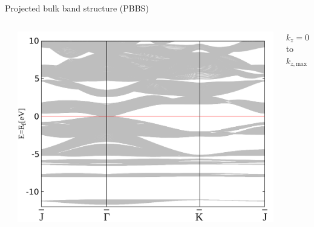 \begin{frame}[fragile]{Projected bulk band structure (PBBS)}
\begin{columns}
\begin{column}{.33\linewidth}
		\end{column}
		\begin{column}{.33\linewidth}
			\centering 
			\includegraphics[width=\linewidth]{andere_bilder/bulk_-12_10.pdf}
		\end{column}
		\begin{column}{.165\linewidth} \scriptsize{
				${k_z=0}$ to $k_{z,\text{max}}$ }
		\end{column}
	\end{columns}	
	\note{
		}
\end{frame}


